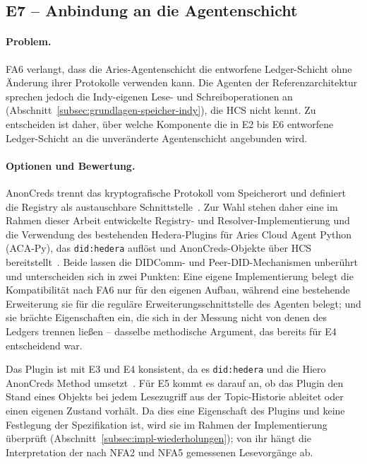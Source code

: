 \subsection{E7 -- Anbindung an die Agentenschicht}
\label{subsec:e7-agentenanbindung}

\paragraph{Problem.}
FA6 verlangt, dass die Aries-Agentenschicht die entworfene Ledger-Schicht ohne Änderung ihrer Protokolle verwenden kann. Die Agenten der Referenzarchitektur sprechen jedoch die Indy-eigenen Lese- und Schreiboperationen an (Abschnitt~\ref{subsec:grundlagen-speicher-indy}), die HCS nicht kennt. Zu entscheiden ist daher, über welche Komponente die in E2 bis E6 entworfene Ledger-Schicht an die unveränderte Agentenschicht angebunden wird.

\paragraph{Optionen und Bewertung.}
AnonCreds trennt das kryptografische Protokoll vom Speicherort und definiert die Registry als austauschbare Schnittstelle~\cite{anoncredsspec}. Zur Wahl stehen daher eine im Rahmen dieser Arbeit entwickelte Registry- und Resolver-Implementierung und die Verwendung des bestehenden Hedera-Plugins für Aries Cloud Agent Python (ACA-Py), das \texttt{did:hedera} auflöst und AnonCreds-Objekte über HCS bereitstellt~\cite{acapyhedera}. Beide lassen die DIDComm- und Peer-DID-Mechanismen unberührt und unterscheiden sich in zwei Punkten: Eine eigene Implementierung belegt die Kompatibilität nach FA6 nur für den eigenen Aufbau, während eine bestehende Erweiterung sie für die reguläre Erweiterungsschnittstelle des Agenten belegt; und sie brächte Eigenschaften ein, die sich in der Messung nicht von denen des Ledgers trennen ließen -- dasselbe methodische Argument, das bereits für E4 entscheidend war.

Das Plugin ist mit E3 und E4 konsistent, da es \texttt{did:hedera} und die Hiero AnonCreds Method umsetzt~\cite{acapyhedera,hasheddidmethod,hieroanoncreds}. Für E5 kommt es darauf an, ob das Plugin den Stand eines Objekts bei jedem Lesezugriff aus der Topic-Historie ableitet oder einen eigenen Zustand vorhält. Da dies eine Eigenschaft des Plugins und keine Festlegung der Spezifikation ist, wird sie im Rahmen der Implementierung überprüft (Abschnitt~\ref{subsec:impl-wiederholungen}); von ihr hängt die Interpretation der nach NFA2 und NFA5 gemessenen Lesevorgänge ab.

